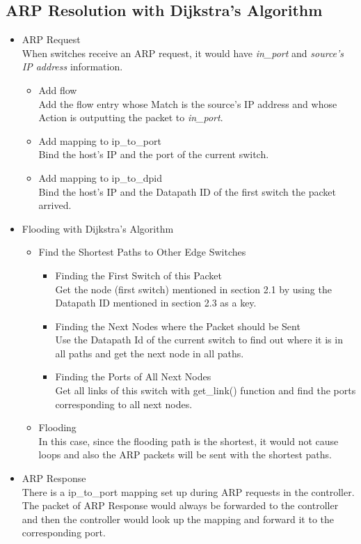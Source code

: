 \documentclass[a4paper,11pt]{article}
\begin{document}
\subsection{ARP Resolution with Dijkstra's Algorithm}
\begin{itemize}
    \item ARP Request \\
    When switches receive an ARP request, it would have \textit{in\_port} and \textit{source's IP address} information.
    \begin{itemize}
        \item Add flow \\
        Add the flow entry whose Match is the source's IP address and whose Action is outputting the packet to \textit{in\_port}.
        \item Add mapping to ip\_to\_port \\
        Bind the host's IP and the port of the current switch.
        \item Add mapping to ip\_to\_dpid \\
        Bind the host's IP and the Datapath ID of the first switch the packet arrived.\\
    \end{itemize}
    \item Flooding with Dijkstra's Algorithm
    \begin{itemize}
        \item Find the Shortest Paths to Other Edge Switches
        \begin{itemize}
            \item Finding the First Switch of this Packet \\
            Get the node (first switch) mentioned in section 2.1 by using the Datapath ID mentioned in section 2.3 as a key.
            \item Finding the Next Nodes where the Packet should be Sent \\
            Use the Datapath Id of the current switch to find out where it is in all paths and get the next node in all paths.
            \item Finding the Ports of All Next Nodes \\
            Get all links of this switch with get\_link() function and find the ports corresponding to all next nodes.
        \end{itemize}
        \item Flooding \\
        In this case, since the flooding path is the shortest, it would not cause loops and also the ARP packets will be sent with the shortest paths.
    \end{itemize}
    \item ARP Response \\
    There is a ip\_to\_port mapping set up during ARP requests in the controller. The packet of ARP Response would always be forwarded to the controller and then the controller would look up the mapping and forward it to the corresponding port.
\end{itemize}
\end{document}
